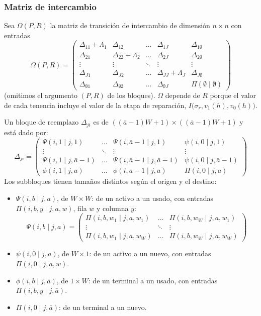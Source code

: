 \documentclass{article}
\begin{document}
\subsubsection{Matriz de intercambio}

Sea $\Omega(P,R)$ la matriz de transición de intercambio de dimensión $n\times n$ con entradas
$$
\Omega(P,R)=\begin{pmatrix}
    \Delta_{11}+\Lambda_{1} & \Delta_{12} & \dots & \Delta_{1J} & \Delta_{1\emptyset} \\
    \Delta_{21} & \Delta_{22}+\Lambda_2 & \dots & \Delta_{2J} & \Delta_{2\emptyset} \\
    \vdots & \vdots & \ddots & \vdots & \vdots \\
    \Delta_{J1} & \Delta_{J2} & \dots & \Delta_{JJ}+\Lambda_{J} & \Delta_{J\emptyset} \\
    \Delta_{\emptyset 1} & \Delta_{\emptyset 2} & \dots & \Delta_{\emptyset J} & \Pi(\emptyset \mid \emptyset)
\end{pmatrix}
$$
(omitimos el argumento $(P,R)$ de los bloques). $\Omega$ depende de $R$ porque el valor de cada tenencia incluye el valor de la etapa de reparación, $I\big(\sigma_r,v_1(h),v_0(h)\big)$.

Un bloque de reemplazo $\Delta_{ji}$ es de $((\bar{a}-1)W+1)\times((\bar{a}-1)W+1)$ y está dado por:
$$
\Delta_{ji}=
\begin{pmatrix}
    \Psi(i,1\mid j,1) & \dots & \Psi(i,\bar{a}-1 \mid j, 1) & \psi(i, 0 \mid j, 1) \\
    \vdots & \ddots & \vdots & \vdots \\
    \Psi(i,1\mid j, \bar{a}-1) & \dots & \Psi(i,\bar{a}-1 \mid j, \bar{a} - 1) & \psi(i,0 \mid j, \bar{a} - 1) \\
    \phi(i,1 \mid j, \bar{a}) & \dots & \phi(i,\bar{a}-1 \mid j, \bar{a}) & \Pi(i,0 \mid j, \bar{a})
\end{pmatrix}
$$
Los subbloques tienen tamaños distintos según el origen y el destino:
\begin{itemize}
    \item $\Psi(i,b\mid j,a)$, de $W\times W$: de un activo a un usado, con entradas $\Pi(i,b,y\mid j,a,w)$, fila $w$ y columna $y$:
    $$\Psi(i,b \mid j, a)=
    \begin{pmatrix}
        \Pi(i,b,w_1\mid j,a,w_1) & \dots & \Pi(i,b,w_W\mid j,a,w_1)\\
        \vdots & \ddots & \vdots \\
        \Pi(i,b,w_1\mid j,a,w_W) & \dots & \Pi(i,b,w_W\mid j,a,w_W)
    \end{pmatrix}$$
    \item $\psi(i,0\mid j,a)$, de $W\times 1$: de un activo a un nuevo, con entradas $\Pi(i,0\mid j,a,w)$.
    \item $\phi(i,b\mid j,\bar{a})$, de $1\times W$: de un terminal a un usado, con entradas $\Pi(i,b,y\mid j,\bar{a})$.
    \item $\Pi(i,0\mid j,\bar{a})$: de un terminal a un nuevo.
\end{itemize}
\end{document}
